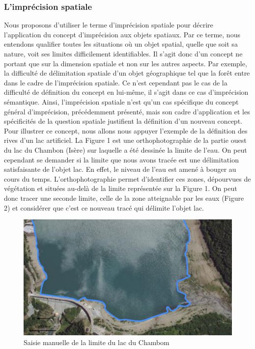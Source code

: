 \subsubsection{L’imprécision spatiale}

Nous proposons d’utiliser le terme d’imprécision spatiale pour décrire
l’application du concept d’imprécision aux objets spatiaux. Par ce
terme, nous entendons qualifier toutes les situations où un objet
spatial, quelle que soit sa nature, voit ses limites difficilement
identifiables. Il s’agit donc d’un concept ne portant que sur la
dimension spatiale et non sur les autres aspects. Par exemple, la
difficulté de délimitation spatiale d’un objet géographique tel que la
forêt entre dans le cadre de l’imprécision spatiale. Ce n’est
cependant pas le cas de la difficulté de définition du concept en
lui-même, il s’agit dans ce cas d’imprécision sémantique. Ainsi,
l’imprécision spatiale n’est qu’un cas spécifique du concept général
d’imprécision, précédemment présenté, mais son cadre d’application et
les spécificités de la question spatiale justifient la définition d’un
nouveau concept.  Pour illustrer ce concept, nous allons nous appuyer
l’exemple de la définition des rives d’un lac artificiel. La Figure 1
est une orthophotographie de la partie ouest du lac du Chambon (Isère)
sur laquelle a été dessinée la limite de l’eau. On peut cependant se
demander si la limite que nous avons tracée est une délimitation
satisfaisante de l’objet lac. En effet, le niveau de l’eau est amené à
bouger au cours du temps. L’orthophotographie permet d’identifier ces
zones, dépourvues de végétation et situées au-delà de la limite
représentée sur la Figure 1. On peut donc tracer une seconde limite,
celle de la zone atteignable par les eaux (Figure 2) et considérer que
c’est ce nouveau tracé qui délimite l’objet lac.

\begin{figure}
  \centering
  \includegraphics{../figures/fig1.png}
  \caption{Saisie manuelle de la limite du lac du Chambom}
  \label{fig:lim_champ}
\end{figure}

